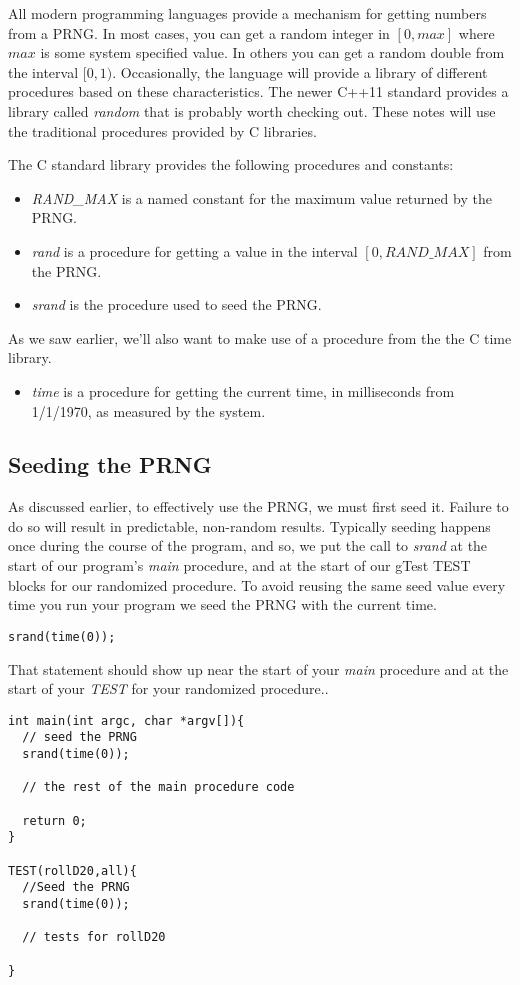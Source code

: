 \documentclass[]{tufte-handout}
\begin{document}
All modern programming languages provide a mechanism for getting numbers from a PRNG. In most cases, you can get a random integer in $[0,max]$ where $max$ is some system specified value.  In others you can get a random double from the interval $[0,1)$.  Occasionally, the language will provide a library of different procedures based on these characteristics.  The newer C++11 standard provides a library called \textit{random} that is probably worth checking out.  These notes will use the traditional procedures provided by C libraries. 

The C standard library provides the following procedures and constants:
\begin{itemize}
\item \textit{RAND\_MAX} is a named constant for the maximum value returned  by the PRNG.
\item \textit{rand} is a procedure for getting a value in the interval $[0,RAND\_MAX]$  from the PRNG.
\item \textit{srand} is the procedure used to seed the PRNG.
\end{itemize}

As we saw earlier, we'll also want to make use of a procedure from the the C time library.
\begin{itemize}
\item \textit{time} is a procedure for getting the current time, in milliseconds from 1/1/1970, as measured by the system. 
\end{itemize}

\subsection{Seeding the PRNG}
As discussed earlier, to effectively use the PRNG, we must first seed it. Failure to do so will result in predictable, non-random results.  Typically seeding happens once during the course of the program, and so, we put the call to \textit{srand} at the start of our program's \textit{main} procedure, and at the start of our gTest TEST blocks for our randomized procedure.  To avoid reusing the same seed value every time you run your program we seed the PRNG with the current time.

\begin{verbatim}
srand(time(0));
\end{verbatim}

That statement should show up near the start of your \textit{main} procedure and at the start of your \textit{TEST} for your randomized procedure.. 
\begin{verbatim}
int main(int argc, char *argv[]){
  // seed the PRNG
  srand(time(0));
  
  // the rest of the main procedure code
  
  return 0;
}

TEST(rollD20,all){
  //Seed the PRNG
  srand(time(0));
  
  // tests for rollD20
  
}
\end{verbatim}
\end{document}
